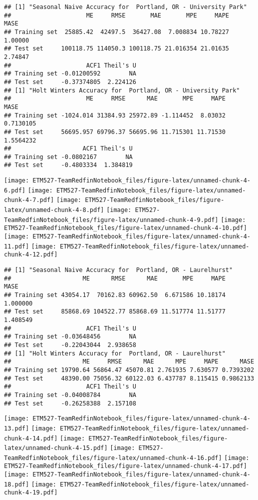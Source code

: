 \documentclass[]{article}
\begin{document}
\begin{verbatim}
## [1] "Seasonal Naive Accuracy for  Portland, OR - University Park"
##                     ME     RMSE       MAE       MPE     MAPE    MASE
## Training set  25885.42  42497.5  36427.08  7.008834 10.78227 1.00000
## Test set     100118.75 114050.3 100118.75 21.016354 21.01635 2.74847
##                     ACF1 Theil's U
## Training set -0.01200592        NA
## Test set     -0.37374805  2.224126
## [1] "Holt Winters Accuracy for  Portland, OR - University Park"
##                     ME     RMSE      MAE       MPE     MAPE      MASE
## Training set -1024.014 31384.93 25972.89 -1.114452  8.03032 0.7130105
## Test set     56695.957 69796.37 56695.96 11.715301 11.71530 1.5564232
##                    ACF1 Theil's U
## Training set -0.0802167        NA
## Test set     -0.4803334  1.384819
\end{verbatim}

\texttt{[image: ETM527-TeamRedfinNotebook\_files/figure-latex/unnamed-chunk-4-6.pdf]}
\texttt{[image: ETM527-TeamRedfinNotebook\_files/figure-latex/unnamed-chunk-4-7.pdf]}
\texttt{[image: ETM527-TeamRedfinNotebook\_files/figure-latex/unnamed-chunk-4-8.pdf]}
\texttt{[image: ETM527-TeamRedfinNotebook\_files/figure-latex/unnamed-chunk-4-9.pdf]}
\texttt{[image: ETM527-TeamRedfinNotebook\_files/figure-latex/unnamed-chunk-4-10.pdf]}
\texttt{[image: ETM527-TeamRedfinNotebook\_files/figure-latex/unnamed-chunk-4-11.pdf]}
\texttt{[image: ETM527-TeamRedfinNotebook\_files/figure-latex/unnamed-chunk-4-12.pdf]}

\begin{verbatim}
## [1] "Seasonal Naive Accuracy for  Portland, OR - Laurelhurst"
##                    ME      RMSE      MAE       MPE     MAPE     MASE
## Training set 43054.17  70162.83 60962.50  6.671586 10.18174 1.000000
## Test set     85868.69 104522.77 85868.69 11.517774 11.51777 1.408549
##                     ACF1 Theil's U
## Training set -0.03648456        NA
## Test set     -0.22043044  2.938658
## [1] "Holt Winters Accuracy for  Portland, OR - Laurelhurst"
##                    ME     RMSE      MAE      MPE     MAPE      MASE
## Training set 19790.64 56864.47 45070.81 2.761935 7.630577 0.7393202
## Test set     48390.00 75056.32 60122.03 6.437787 8.115415 0.9862133
##                     ACF1 Theil's U
## Training set -0.04008784        NA
## Test set     -0.26258388  2.157108
\end{verbatim}

\texttt{[image: ETM527-TeamRedfinNotebook\_files/figure-latex/unnamed-chunk-4-13.pdf]}
\texttt{[image: ETM527-TeamRedfinNotebook\_files/figure-latex/unnamed-chunk-4-14.pdf]}
\texttt{[image: ETM527-TeamRedfinNotebook\_files/figure-latex/unnamed-chunk-4-15.pdf]}
\texttt{[image: ETM527-TeamRedfinNotebook\_files/figure-latex/unnamed-chunk-4-16.pdf]}
\texttt{[image: ETM527-TeamRedfinNotebook\_files/figure-latex/unnamed-chunk-4-17.pdf]}
\texttt{[image: ETM527-TeamRedfinNotebook\_files/figure-latex/unnamed-chunk-4-18.pdf]}
\texttt{[image: ETM527-TeamRedfinNotebook\_files/figure-latex/unnamed-chunk-4-19.pdf]}
\end{document}
